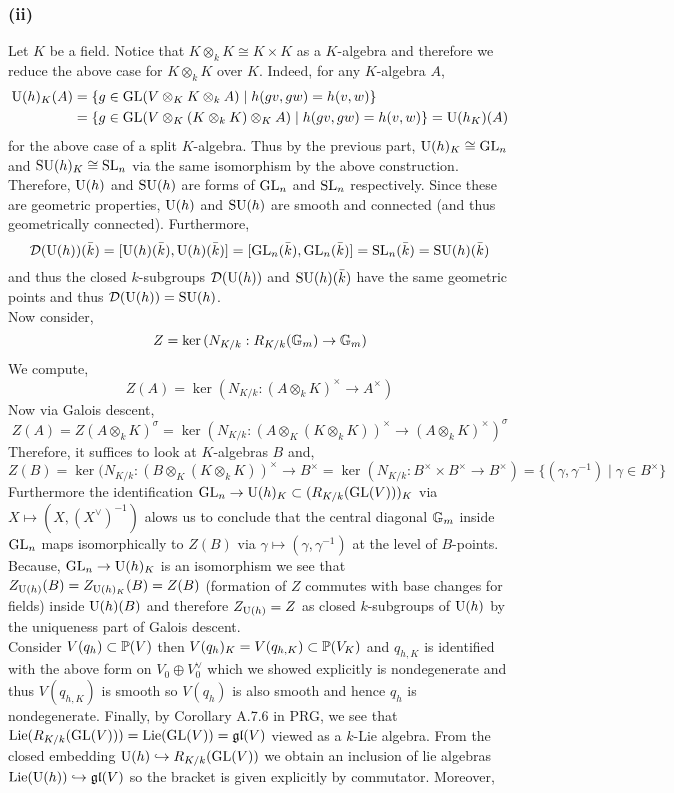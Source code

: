 \documentclass[12pt]{article}
\begin{document}
\subsubsection{(ii)}
Let $K$ be a field. Notice that $K \otimes_k K \cong K \times K$ as a $K$-algebra and therefore we reduce the above case for $K \otimes_k K$ over $K$. Indeed, for any $K$-algebra $A$,
\begin{align*}
\U(h)_K(A) & = \{ g \in \GL(V \otimes_K K \otimes_k A) \mid h(gv,gw) = h(v,w) \} 
\\
& = \{ g \in \GL(V \otimes_K (K \otimes_k K) \otimes_K A) \mid h(gv, gw) = h(v,w) \} = \U(h_K)(A)
\end{align*}
for the above case of a split \etale $K$-algebra. Thus by the previous part, $\U(h)_K \cong \GL_n$ and $\SU(h)_K \cong \SL_n$ via the same isomorphism by the above construction. Therefore, $\U(h)$ and $\SU(h)$ are forms of $\GL_n$ and $\SL_n$ respectively. Since these are geometric properties, $\U(h)$ and $\SU(h)$ are smooth and connected (and thus geometrically connected). Furthermore, 
\[ \D(\U(h))(\bar{k}) = [\U(h)(\bar{k}), \U(h)(\bar{k})] = [\GL_n(\bar{k}), \GL_n(\bar{k})] = \SL_n(\bar{k}) = \SU(h)(\bar{k}) \]
and thus the closed $k$-subgroups $\D(\U(h))$ and $\SU(h)(\bar{k})$ have the same geometric points and thus $\D(\U(h)) = \SU(h)$.
\bigskip\\
Now consider,
\[ Z = \ker{(N_{K/k} : R_{K/k}(\Gm) \to \Gm)} \]
We compute,
\[ Z(A) = \ker{(N_{K/k} : (A \otimes_k K)^\times \to A^\times)} \]
Now via Galois descent,
\[ Z(A) = Z(A \otimes_k K)^\sigma = \ker{(N_{K/k} : (A \otimes_K (K \otimes_k K))^\times \to (A \otimes_k K)^\times)}^\sigma  \]
Therefore, it suffices to look at $K$-algebras $B$ and,
\[ Z(B) = \ker{(N_{K/k} : (B \otimes_K (K \otimes_k K))^\times \to B^\times} = \ker{(N_{K/k} : B^\times \times B^\times \to B^\times)} = \{ (\gamma, \gamma^{-1}) \mid \gamma \in B^\times \} \]
Furthermore the identification $\GL_n \to \U(h)_K \subset (R_{K/k} (\GL(V)))_K$ via $X \mapsto (X, (X^\vee)^{-1})$ alows us to conclude that the central diagonal $\Gm$ inside $\GL_n$ maps isomorphically to $Z(B)$ via $\gamma \mapsto (\gamma, \gamma^{-1})$ at the level of $B$-points. Because, $\GL_n \to \U(h)_K$ is an isomorphism we see that $Z_{\U(h)}(B) = Z_{\U(h)_K}(B) = Z(B)$ (formation of $Z$ commutes with base changes for fields) inside $\U(h)(B)$ and therefore $Z_{\U(h)} = Z$ as closed $k$-subgroups of $\U(h)$ by the uniqueness part of Galois descent.
\bigskip\\
Consider $V(q_h) \subset \P(V)$ then $V(q_h)_K = V(q_{h,K}) \subset \P(V_K)$ and $q_{h,K}$ is identified with the above form on $V_0 \oplus V_0^\vee$ which we showed explicitly is nondegenerate and thus $V(q_{h,K})$ is smooth so $V(q_h)$ is also smooth and hence $q_h$ is nondegenerate. Finally, by Corollary A.7.6 in PRG, we see that $\Lie(R_{K/k}(\GL(V))) = \Lie(\GL(V)) = \gl(V)$ viewed as a $k$-Lie algebra. From the closed embedding $\U(h) \embed R_{K/k}(\GL(V))$ we obtain an inclusion of lie algebras $\Lie(\U(h)) \embed \gl(V)$ so the bracket is given explicitly by commutator. Moreover,
\end{document}
